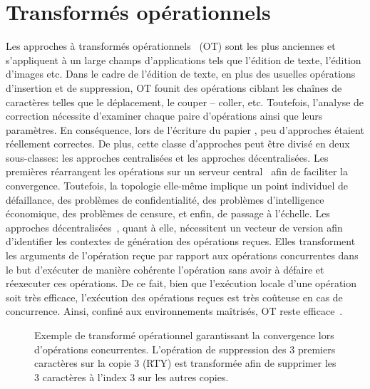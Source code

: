 
\section{Transformés opérationnels}
\label{repl:sec:ot}

Les approches à transformés opérationnels~\cite{sun1998operational,
  sun2009contextbased} (OT) sont les plus anciennes et s'appliquent à un large
champs d'applications tels que l'édition de texte, l'édition d'images etc. Dans
le cadre de l'édition de texte, en plus des usuelles opérations d'insertion et
de suppression, OT founit des opérations ciblant les chaînes de caractères
telles que le déplacement, le couper -- coller, etc. Toutefois, l'analyse de
correction nécessite d'examiner chaque paire d'opérations ainsi que leurs
paramètres. En conséquence, lors de l'écriture du papier
\cite{imine2003proving}, peu d'approches étaient réellement correctes. De plus,
cette classe d'approches peut être divisé en deux sous-classes: les approches
centralisées et les approches décentralisées. Les premières réarrangent les
opérations sur un serveur central~\cite{nichols1995high} afin de faciliter la
convergence. Toutefois, la topologie elle-même implique un point individuel de
défaillance, des problèmes de confidentialité, des problèmes d'intelligence
économique, des problèmes de censure, et enfin, de passage à l'échelle. Les
approches décentralisées~\cite{sun2009contextbased}, quant à elle, nécessitent
un vecteur de version afin d'identifier les contextes de génération des
opérations reçues. Elles transforment les arguments de l'opération reçue par
rapport aux opérations concurrentes dans le but d'exécuter de manière cohérente
l'opération sans avoir à défaire et réexecuter ces opérations. De ce fait, bien
que l'exécution locale d'une opération soit très efficace, l'exécution des
opérations reçues est très coûteuse en cas de concurrence. Ainsi, confiné aux
environnements maîtrisés, OT reste efficace~\cite{mehdi2014merging}.

\begin{figure}
  \centering
  
  \caption{\label{seq:fig:otexample}Exemple de transformé opérationnel
    garantissant la convergence lors d'opérations concurrentes. L'opération de
    suppression des 3 premiers caractères sur la copie 3 (RTY) est transformée
    afin de supprimer les 3 caractères à l'index 3 sur les autres copies.}
\end{figure}

